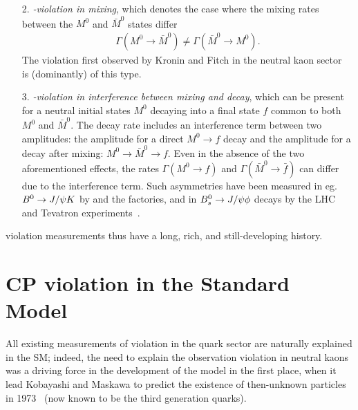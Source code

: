 \begin{enumerate}
    \item[2.] \emph{\CP-violation in mixing}, which denotes the case where the mixing rates between the $M^0$ and $\bar M^0$ states differ
    \begin{align}
        \Gamma (M^0 \to \bar M^0) \neq \Gamma (\bar  M^0 \to M^0).
    \end{align}
    The \CP violation first observed by Kronin and Fitch in the neutral kaon sector~\cite{KroninFitch1964} is (dominantly) of this type. 
    
    \item[3.] \emph{\CP-violation in interference between mixing and decay}, which can be present for a neutral initial states $M^0$ decaying into a final state $f$ common to both $M^0$ and $\bar M^0$. The decay rate includes an interference term between two amplitudes: the amplitude for a direct $M^0\to f$ decay and the amplitude for a decay after mixing: $M^0\to\bar M^0\to f$. Even in the absence of the two aforementioned effects, the rates $\Gamma(M^0\to f)$ and $\Gamma(\bar M^0\to \bar f)$ can differ due to the interference term. Such \CP asymmetries have been measured in eg. ${{B}^0}\rightarrow J/\psi K$ by \lhcb and the \B factories, and in ${{B}^0_{s}}\rightarrow J/\psi \phi$ decays by the LHC and Tevatron experiments~\cite{HFLAV}.
\end{enumerate}
\CP violation measurements thus have a long, rich, and still-developing history.  


\section{CP violation in the Standard Model} %
\label{sec:cp_violation_in_the_standard_model}

All existing measurements of \CP violation in the quark sector are naturally explained in the SM; indeed, the need to explain the observation \CP violation in neutral kaons was a driving force in the development of the model in the first place, when it lead Kobayashi and Maskawa to predict the existence of then-unknown particles in 1973~\cite{kobayashiCPViolationRenormalizableTheory1973} (now known to be the third generation quarks). 

